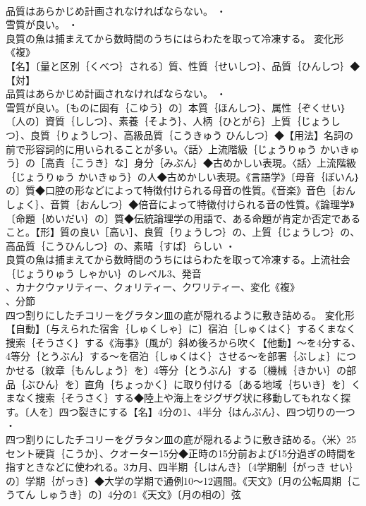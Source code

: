 \documentclass[8pt]{extreport}
\begin{document}
\begin{CJK}{UTF8}{min}
\\	品質はあらかじめ計画されなければならない。 ・
\\	雪質が良い。 ・
\\	良質の魚は捕まえてから数時間のうちにはらわたを取って冷凍する。	変化形 
\\	《複》
\\	【名】〔量と区別｛くべつ｝される〕質、性質｛せいしつ｝、品質｛ひんしつ｝◆【対】
\\	品質はあらかじめ計画されなければならない。 ・
\\	雪質が良い。〔ものに固有｛こゆう｝の〕本質｛ほんしつ｝、属性｛ぞくせい｝〔人の〕資質｛ししつ｝、素養｛そよう｝、人柄｛ひとがら｝上質｛じょうしつ｝、良質｛りょうしつ｝、高級品質｛こうきゅう ひんしつ｝◆【用法】名詞の前で形容詞的に用いられることが多い。〈話〉上流階級｛じょうりゅう かいきゅう｝の［高貴｛こうき｝な］身分｛みぶん｝◆古めかしい表現。〈話〉上流階級｛じょうりゅう かいきゅう｝の人◆古めかしい表現。《言語学》〔母音｛ぼいん｝の〕質◆口腔の形などによって特徴付けられる母音の性質。《音楽》音色｛おんしょく｝、音質｛おんしつ｝◆倍音によって特徴付けられる音の性質。《論理学》〔命題｛めいだい｝の〕質◆伝統論理学の用語で、ある命題が肯定か否定であること。【形】質の良い［高い］、良質｛りょうしつ｝の、上質｛じょうしつ｝の、高品質｛こうひんしつ｝の、素晴｛すば｝らしい ・
\\	良質の魚は捕まえてから数時間のうちにはらわたを取って冷凍する。上流社会｛じょうりゅう しゃかい｝のレベル3、発音
\\	、カナクウァリティー、クォリティー、クワリティー、変化《複》
\\	、分節
\\	四つ割りにしたチコリーをグラタン皿の底が隠れるように敷き詰める。	変化形 
\\	【自動】〔与えられた宿舎｛しゅくしゃ｝に〕宿泊｛しゅくはく｝するくまなく捜索｛そうさく｝する《海事》〔風が〕斜め後ろから吹く【他動】～を4分する、4等分｛とうぶん｝する～を宿泊｛しゅくはく｝させる～を部署｛ぶしょ｝につかせる〔紋章｛もんしょう｝を〕4等分｛とうぶん｝する〔機械｛きかい｝の部品｛ぶひん｝を〕直角｛ちょっかく｝に取り付ける〔ある地域｛ちいき｝を〕くまなく捜索｛そうさく｝する◆陸上や海上をジグザグ状に移動してもれなく探す。〔人を〕四つ裂きにする【名】4分の1、4半分｛はんぶん｝、四つ切りの一つ ・
\\	四つ割りにしたチコリーをグラタン皿の底が隠れるように敷き詰める。〈米〉25セント硬貨｛こうか｝、クオーター15分◆正時の15分前および15分過ぎの時間を指すときなどに使われる。3カ月、四半期｛しはんき｝〔4学期制｛がっき せい｝の〕学期｛がっき｝◆大学の学期で通例10～12週間。《天文》〔月の公転周期｛こうてん しゅうき｝の〕4分の1《天文》〔月の相の〕弦

\end{CJK}
\end{document}

